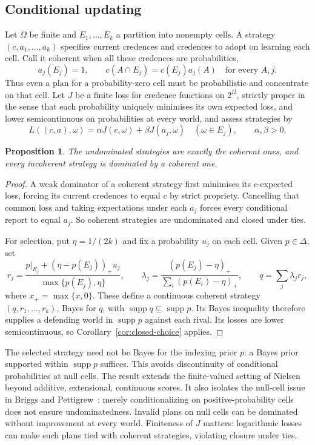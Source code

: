 \documentclass[11pt]{article}
\newtheorem{proposition}[theorem]{Proposition}
\theoremstyle{definition}
\newcommand{\supp}{\operatorname{supp}}
\begin{document}
\subsection{Conditional updating}
Let $\Omega$ be finite and $E_1,\ldots,E_k$ a partition into nonempty cells. A strategy $(c,a_1,\ldots,a_k)$ specifies current credences and credences to adopt on learning each cell. Call it coherent when all these credences are probabilities,
\[
a_j(E_j)=1,\qquad c(A\cap E_j)=c(E_j)a_j(A)\quad\text{for every }A,j.
\]
Thus even a plan for a probability-zero cell must be probabilistic and concentrate on that cell. Let $J$ be a finite loss for credence functions on $2^\Omega$, strictly proper in the sense that each probability uniquely minimises its own expected loss, and lower semicontinuous on probabilities at every world, and assess strategies by
\[
L((c,a),\omega)=\alpha J(c,\omega)+\beta J(a_j,\omega)
\quad(\omega\in E_j),\qquad \alpha,\beta>0.
\]
\begin{proposition}\label{prop:short-updating}
The undominated strategies are exactly the coherent ones, and every incoherent strategy is dominated by a coherent one.
\end{proposition}
\begin{proof}
A weak dominator of a coherent strategy first minimises its $c$-expected loss, forcing its current credences to equal $c$ by strict propriety. Cancelling that common loss and taking expectations under each $a_j$ forces every conditional report to equal $a_j$. So coherent strategies are undominated and closed under ties.

For selection, put $\eta=1/(2k)$ and fix a probability $u_j$ on each cell. Given $p\in\Delta$, set
\[
r_j=\frac{p|_{E_j}+(\eta-p(E_j))_+u_j}{\max\{p(E_j),\eta\}},\qquad
\lambda_j=\frac{(p(E_j)-\eta)_+}{\sum_i(p(E_i)-\eta)_+},\qquad
q=\sum_j\lambda_jr_j,
\]
where $x_+=\max\{x,0\}$. These define a continuous coherent strategy $(q,r_1,\ldots,r_k)$, Bayes for $q$, with $\supp q\subseteq\supp p$. Its Bayes inequality therefore supplies a defending world in $\supp p$ against each rival. Its losses are lower semicontinuous, so Corollary~\ref{cor:closed-choice} applies.
\end{proof}
The selected strategy need not be Bayes for the indexing prior $p$: a Bayes prior supported within $\supp p$ suffices. This avoids discontinuity of conditional probabilities at null cells. The result extends the finite-valued setting of Nielsen~\cite{Nielsen21} beyond additive, extensional, continuous scores. It also isolates the null-cell issue in Briggs and Pettigrew~\cite{BP20}: merely conditionalizing on positive-probability cells does not ensure undominatedness. Invalid plans on null cells can be dominated without improvement at every world. Finiteness of $J$ matters: logarithmic losses can make such plans tied with coherent strategies, violating closure under ties.
\end{document}
